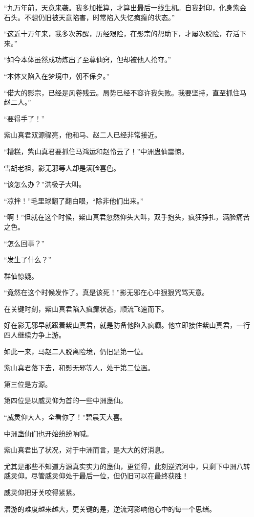 \begin{this_body}
“九万年前，天意来袭。我多加推算，才算出最后一线生机。自我封印，化身紫金石头。不想仍旧被天意陷害，时常陷入失忆疯癫的状态。”

“这近十万年来，我多次苏醒，历经艰险，在影宗的帮助下，才屡次脱险，存活下来。”

“如今本体虽然成功炼出了至尊仙窍，但却被他人抢夺。”

“本体又陷入在梦境中，朝不保夕。”

“偌大的影宗，已经是风卷残云。局势已经不容许我失败。我要坚持，直至抓住马赵二人。”

“要得手了！”

紫山真君双源骤亮，他和马、赵二人已经非常接近。

“糟糕，紫山真君要抓住马鸿运和赵怜云了！”中洲蛊仙震惊。

雪胡老祖，影无邪等人却是满脸喜色。

“该怎么办？”洪极子大叫。

“凉拌！”毛里球翻了翻白眼，“除非他们出来。”

“啊！”但就在这个时候，紫山真君忽然仰头大叫，双手抱头，疯狂挣扎，满脸痛苦之色。

“怎么回事？”

“发生了什么？”

群仙惊疑。

“竟然在这个时候发作了。真是该死！”影无邪在心中狠狠咒骂天意。

在关键时刻，紫山真君陷入疯癫状态，顺流飞速而下。

好在影无邪早就跟着紫山真君，就是防备他陷入疯癫。他立即接住紫山真君，一行四人继续力争上游。

如此一来，马赵二人脱离险境，仍旧是第一位。

紫山真君落下去，和影无邪等人，处于第二位置。

第三位是方源。

第四位是以威灵仰为首的一些中洲蛊仙。

“威灵仰大人，全看你了！”碧晨天大喜。

中洲蛊仙们也开始纷纷呐喊。

紫山真君出了状况，对于中洲而言，是大大的好消息。

尤其是那些不知道方源真实实力的蛊仙，更觉得，此刻逆流河中，只剩下中洲八转威灵仰。尽管威灵仰处于最后一位，但仍旧可以在最终获胜！

威灵仰把牙关咬得紧紧。

潜游的难度越来越大，更关键的是，逆流河影响他心中的每一个思绪。


\end{this_body}

